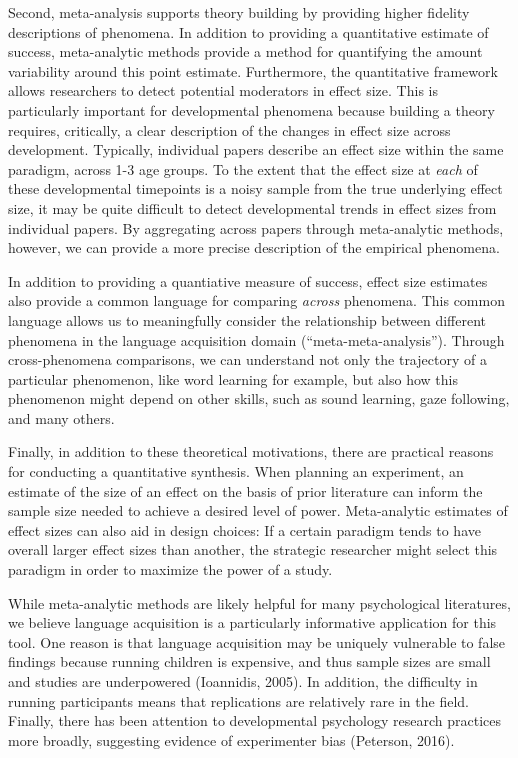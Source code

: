 \documentclass[english,floatsintext,man]{apa6}
\begin{document}
Second, meta-analysis supports theory building by providing higher
fidelity descriptions of phenomena. In addition to providing a
quantitative estimate of success, meta-analytic methods provide a method
for quantifying the amount variability around this point estimate.
Furthermore, the quantitative framework allows researchers to detect
potential moderators in effect size. This is particularly important for
developmental phenomena because building a theory requires, critically,
a clear description of the changes in effect size across development.
Typically, individual papers describe an effect size within the same
paradigm, across 1-3 age groups. To the extent that the effect size at
\emph{each} of these developmental timepoints is a noisy sample from the
true underlying effect size, it may be quite difficult to detect
developmental trends in effect sizes from individual papers. By
aggregating across papers through meta-analytic methods, however, we can
provide a more precise description of the empirical phenomena.

In addition to providing a quantiative measure of success, effect size
estimates also provide a common language for comparing \emph{across}
phenomena. This common language allows us to meaningfully consider the
relationship between different phenomena in the language acquisition
domain (\enquote{meta-meta-analysis}). Through cross-phenomena
comparisons, we can understand not only the trajectory of a particular
phenomenon, like word learning for example, but also how this phenomenon
might depend on other skills, such as sound learning, gaze following,
and many others.

Finally, in addition to these theoretical motivations, there are
practical reasons for conducting a quantitative synthesis. When planning
an experiment, an estimate of the size of an effect on the basis of
prior literature can inform the sample size needed to achieve a desired
level of power. Meta-analytic estimates of effect sizes can also aid in
design choices: If a certain paradigm tends to have overall larger
effect sizes than another, the strategic researcher might select this
paradigm in order to maximize the power of a study.

While meta-analytic methods are likely helpful for many psychological
literatures, we believe language acquisition is a particularly
informative application for this tool. One reason is that language
acquisition may be uniquely vulnerable to false findings because running
children is expensive, and thus sample sizes are small and studies are
underpowered (Ioannidis, 2005). In addition, the difficulty in running
participants means that replications are relatively rare in the field.
Finally, there has been attention to developmental psychology research
practices more broadly, suggesting evidence of experimenter bias
(Peterson, 2016).
\end{document}
